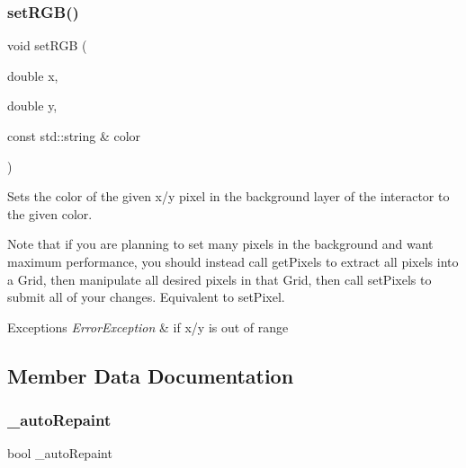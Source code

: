 \subsubsection{\texorpdfstring{set\+R\+G\+B()}{setRGB()}\hspace{0.1cm}{\footnotesize\ttfamily [3/3]}}
{\footnotesize\ttfamily void set\+R\+GB (\begin{DoxyParamCaption}\item[{double}]{x,  }\item[{double}]{y,  }\item[{const std\+::string \&}]{color }\end{DoxyParamCaption})\hspace{0.3cm}{\ttfamily [virtual]}}



Sets the color of the given x/y pixel in the background layer of the interactor to the given color. 

Note that if you are planning to set many pixels in the background and want maximum performance, you should instead call get\+Pixels to extract all pixels into a Grid, then manipulate all desired pixels in that Grid, then call set\+Pixels to submit all of your changes. Equivalent to set\+Pixel.


\begin{DoxyExceptions}{Exceptions}
{\em Error\+Exception} & if x/y is out of range \\
\hline
\end{DoxyExceptions}


\subsection{Member Data Documentation}
\mbox{\label{classGDrawingSurface_a738dd6afc69ac536ad46cf4d89a90933}} 
\subsubsection{\texorpdfstring{\+\_\+auto\+Repaint}{\_autoRepaint}}
{\footnotesize\ttfamily bool \+\_\+auto\+Repaint\hspace{0.3cm}{\ttfamily [protected]}}

\mbox{\label{classGDrawingSurface_ad233544ea51cf6b435a199f3e3790607}} 
